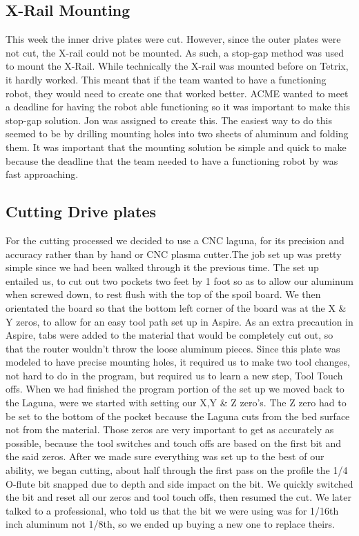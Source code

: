 \documentclass{article}
\begin{document}
\subsection{X-Rail Mounting}
This week the inner drive plates were cut. However, since the outer plates were not cut, the X-rail could not be mounted. As such, a stop-gap method was used to mount the X-Rail. While technically the X-rail was mounted before on Tetrix, it hardly worked. This meant that if the team wanted to have a functioning robot, they would need to create one that worked better. ACME wanted to meet a deadline for having the robot able functioning so it was important to make this stop-gap solution. Jon was assigned to create this. The easiest way to do this seemed to be by drilling mounting holes into two sheets of aluminum and folding them. It was important that the mounting solution be simple and quick to make because the deadline that the team needed to have a functioning robot by was fast approaching. 

\subsection{Cutting Drive plates}
For the cutting processed we decided to use a CNC laguna, for its precision and accuracy rather than by hand or CNC plasma cutter.The job set up was pretty simple since we had been walked through it the previous time. The set up entailed us, to cut out two pockets two feet by 1 foot so as to allow our aluminum when screwed down, to rest flush with the top of the spoil board. We then orientated the board so that the bottom left corner of the board was at the X \& Y zeros, to allow for an easy tool path set up in Aspire. As an extra precaution in Aspire, tabs were added to the material that would be completely cut out, so that the router wouldn't throw the loose aluminum pieces. Since this plate was modeled to have precise mounting holes, it required us to make two tool changes, not hard to do in the program, but required us to learn a new step, Tool Touch offs. When we had finished the program portion of the set up we moved back to the Laguna, were we started with setting our X,Y \& Z zero's. The Z zero had to be set to the bottom of the pocket because the Laguna cuts from the bed surface not from the material. Those zeros are very important to get as accurately as possible, because the tool switches and touch offs are based on the first bit and the said zeros. After we made sure everything was set up to the best of our ability, we began cutting, about half through the first pass on the profile the 1/4 O-flute bit snapped due to depth and side impact on the bit. We quickly switched the bit and reset all our zeros and tool touch offs, then resumed the cut. We later talked to a professional, who told us that the bit we were using was for 1/16th inch aluminum not 1/8th, so we ended up buying a new one to replace theirs.  
\end{document}
